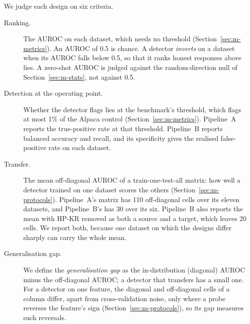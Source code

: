 We judge each design on six criteria.
\begin{description}
\item[Ranking.] The AUROC on each dataset, which needs no threshold (Section~\ref{sec:m-metrics}).
An AUROC of 0.5 is chance.
A detector \emph{inverts} on a dataset when its AUROC falls below 0.5, so that it ranks honest responses above lies.
A zero-shot AUROC is judged against the random-direction null of Section~\ref{sec:m-stats}, not against 0.5.
\item[Detection at the operating point.] Whether the detector flags lies at the benchmark's threshold, which flags at most 1\% of the Alpaca control (Section~\ref{sec:m-metrics}).
Pipeline~A reports the true-positive rate at that threshold. %
Pipeline~B reports balanced accuracy and recall, and its specificity gives the realised false-positive rate on each dataset. %
\item[Transfer.] The mean off-diagonal AUROC of a train-one-test-all matrix: how well a detector trained on one dataset scores the others (Section~\ref{sec:m-protocols}).
Pipeline~A's matrix has 110 off-diagonal cells over its eleven datasets, and Pipeline~B's has 30 over its six. %
Pipeline~B also reports the mean with HP-KR removed as both a source and a target, which leaves 20 cells. %
We report both, because one dataset on which the designs differ sharply can carry the whole mean. %
\item[Generalisation gap.] We define the \emph{generalisation gap} as the in-distribution (diagonal) AUROC minus the off-diagonal AUROC; a detector that transfers has a small one.
For a detector on one feature, the diagonal and off-diagonal cells of a column differ, apart from cross-validation noise, only where a probe reverses the feature's sign (Section~\ref{sec:m-protocols}), so its gap measures such reversals. %

\end{description}
